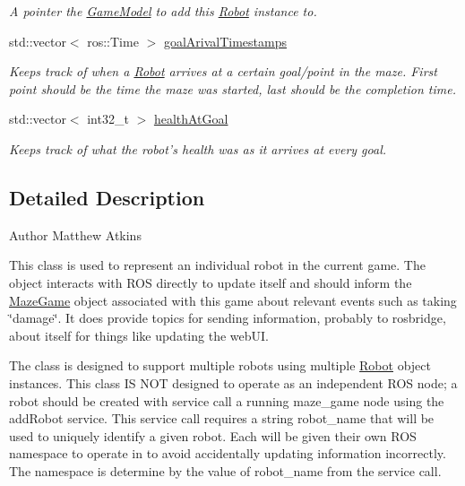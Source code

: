 \begin{DoxyCompactItemize}
\begin{DoxyCompactList}\small\item\em A pointer the \hyperlink{classGameModel}{Game\-Model} to add this \hyperlink{classRobot}{Robot} instance to. \end{DoxyCompactList}\item 
\hypertarget{classRobot_a33ba4c43aec621b12fe9bb3979afafbb}{std\-::vector$<$ ros\-::\-Time $>$ \hyperlink{classRobot_a33ba4c43aec621b12fe9bb3979afafbb}{goal\-Arival\-Timestamps}}\label{classRobot_a33ba4c43aec621b12fe9bb3979afafbb}

\begin{DoxyCompactList}\small\item\em Keeps track of when a \hyperlink{classRobot}{Robot} arrives at a certain goal/point in the maze. First point should be the time the maze was started, last should be the completion time. \end{DoxyCompactList}\item 
\hypertarget{classRobot_a4685295702ad481fdd2b78e54c2b1050}{std\-::vector$<$ int32\-\_\-t $>$ \hyperlink{classRobot_a4685295702ad481fdd2b78e54c2b1050}{health\-At\-Goal}}\label{classRobot_a4685295702ad481fdd2b78e54c2b1050}

\begin{DoxyCompactList}\small\item\em Keeps track of what the robot's health was as it arrives at every goal. \end{DoxyCompactList}\end{DoxyCompactItemize}


\subsection{Detailed Description}
\begin{DoxyAuthor}{Author}
Matthew Atkins
\end{DoxyAuthor}
This class is used to represent an individual robot in the current game. The object interacts with R\-O\-S directly to update itself and should inform the \hyperlink{classMazeGame}{Maze\-Game} object associated with this game about relevant events such as taking \char`\"{}damage\char`\"{}. It does provide topics for sending information, probably to rosbridge, about itself for things like updating the web\-U\-I.

The class is designed to support multiple robots using multiple \hyperlink{classRobot}{Robot} object instances. This class I\-S N\-O\-T designed to operate as an independent R\-O\-S node; a robot should be created with service call a running maze\-\_\-game node using the add\-Robot service. This service call requires a string robot\-\_\-name that will be used to uniquely identify a given robot. Each will be given their own R\-O\-S namespace to operate in to avoid accidentally updating information incorrectly. The namespace is determine by the value of robot\-\_\-name from the service call.

